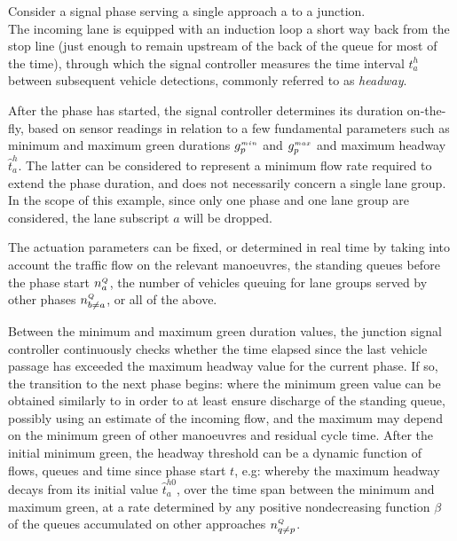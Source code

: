 Consider a signal phase serving a single approach a to a junction.\\
The incoming lane is equipped with an induction loop a short way back from the stop line
(just enough to remain upstream of the back of the queue for most of the time), through which
the signal controller measures the time interval $t_a^h$ between subsequent vehicle detections,
commonly referred to as \emph{headway}.

After the phase has started, the signal controller determines its duration on-the-fly, based
on sensor readings in relation to a few fundamental parameters such as minimum and
maximum green durations $g_{p}^{\scriptscriptstyle{min}}$ and $g_{p}^{\scriptscriptstyle{max}}$ and maximum headway $\hat{t}_a^h$. The latter can be considered to represent a minimum flow rate required to extend the phase duration, and does not necessarily concern a single lane group.
In the scope of this example, since only one phase and one lane group are considered, the lane subscript $a$ will be dropped.

The actuation parameters can be fixed, or determined in real time by taking into account the traffic flow on the relevant manoeuvres, the standing queues before the phase start $n_{a}^{\scriptscriptstyle{Q}}$, the number of vehicles queuing for lane groups served by other phases $n_{b \neq a}^{\scriptscriptstyle{Q}}$, or all of the above.

Between the minimum and maximum green duration values, the junction signal controller
continuously checks whether the time elapsed since the last vehicle passage has exceeded the
maximum headway value for the current phase. If so, the transition to the next phase begins:
where the minimum green value can be obtained similarly to  in order to at least ensure discharge of the standing queue, possibly using an estimate of the incoming flow, and the
maximum may depend on the minimum green of other manoeuvres and residual cycle time.
After the initial minimum green, the headway threshold can be a dynamic function of flows,
queues and time since phase start $t$, e.g:
whereby the maximum headway decays from its initial value $\hat{t}_a^{h0}$, over the time span between the minimum and maximum green, at a rate determined by any positive nondecreasing
function $\beta$ of the queues accumulated on other approaches $n_{q \neq p}^{\scriptscriptstyle{Q}}$.

